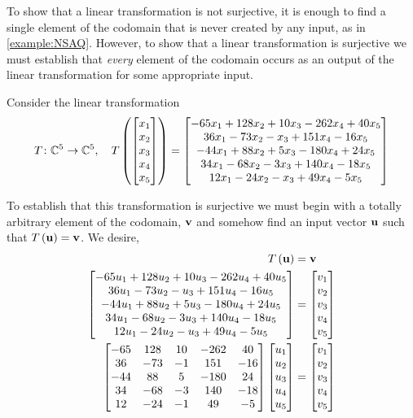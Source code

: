 \documentclass{ximera}
\begin{document}
To show that a linear transformation is not surjective, it is enough to find a single element of the codomain that is never created by any input, as in \ref{example:NSAQ}.  However, to show that a linear transformation is surjective we must establish that \textit{every} element of the codomain occurs as an output of the linear transformation for some appropriate input.


\begin{example}

Consider the linear transformation
\[
T\colon \mathbb{C}^{5}\rightarrow\mathbb{C}^{5},\quad
T\left(\begin{bmatrix}x_1\\x_2\\x_3\\x_4\\x_5\end{bmatrix}\right)=
\begin{bmatrix}-65 x_1 + 128 x_2 + 10 x_3 - 262 x_4 + 40 x_5\\
36 x_1 - 73 x_2 - x_3 + 151 x_4 - 16 x_5\\
-44 x_1 + 88 x_2 + 5 x_3 - 180 x_4 + 24 x_5\\
34 x_1 - 68 x_2 - 3 x_3 + 140 x_4 - 18 x_5\\
12 x_1 - 24 x_2 - x_3 + 49 x_4 - 5 x_5\end{bmatrix}
\]


To establish that this transformation is surjective we must begin with a totally arbitrary element of the codomain, $\mathbf{v}$ and somehow find an input vector $\mathbf{u}$ such that $T\left(\mathbf{u}\right)=\mathbf{v}$.  We desire,
\begin{align*}
T\left(\mathbf{u}\right)&=\mathbf{v}\\
\begin{bmatrix}-65 u_1 + 128 u_2 + 10 u_3 - 262 u_4 + 40 u_5\\
36 u_1 - 73 u_2 - u_3 + 151 u_4 - 16 u_5\\
-44 u_1 + 88 u_2 + 5 u_3 - 180 u_4 + 24 u_5\\
34 u_1 - 68 u_2 - 3 u_3 + 140 u_4 - 18 u_5\\
12 u_1 - 24 u_2 - u_3 + 49 u_4 - 5 u_5\end{bmatrix}
&=
\begin{bmatrix}v_1\\v_2\\v_3\\v_4\\v_5\end{bmatrix}\\
\begin{bmatrix}
-65&128&10&-262&40\\
36&-73&-1&151&-16\\
-44&88&5&-180&24\\
34&-68&-3&140&-18\\
12&-24&-1&49&-5
\end{bmatrix}
\begin{bmatrix}u_1\\u_2\\u_3\\u_4\\u_5\end{bmatrix}
&=
\begin{bmatrix}v_1\\v_2\\v_3\\v_4\\v_5\end{bmatrix}
\end{align*}





\end{example}
\end{document}

